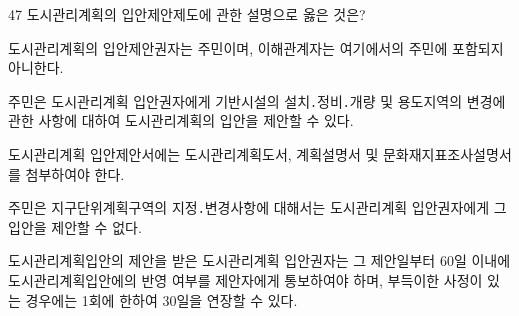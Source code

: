 \begin{question}{47}
도시관리계획의 입안제안제도에 관한 설명으로 옳은 것은?
\begin{choices}
  \item 도시관리계획의 입안제안권자는 주민이며, 이해관계자는 여기에서의 주민에 포함되지 아니한다.
  \item 주민은 도시관리계획 입안권자에게 기반시설의 설치․정비․개량 및 용도지역의 변경에 관한 사항에 대하여 도시관리계획의 입안을 제안할 수 있다.
  \item 도시관리계획 입안제안서에는 도시관리계획도서, 계획설명서 및 문화재지표조사설명서를 첨부하여야 한다.
  \item 주민은 지구단위계획구역의 지정․변경사항에 대해서는 도시관리계획 입안권자에게 그 입안을 제안할 수 없다.
  \item 도시관리계획입안의 제안을 받은 도시관리계획 입안권자는 그 제안일부터 60일 이내에 도시관리계획입안에의 반영 여부를 제안자에게 통보하여야 하며, 부득이한 사정이 있는 경우에는 1회에 한하여 30일을 연장할 수 있다.
\end{choices}
\end{question}
